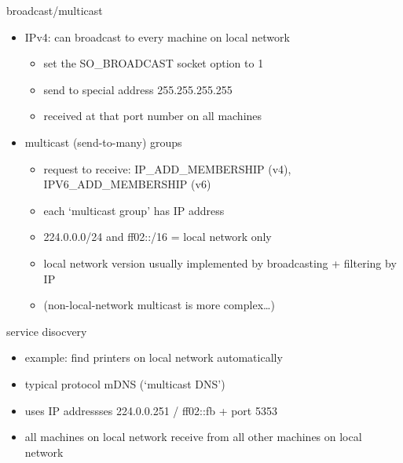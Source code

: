 \begin{frame}{broadcast/multicast}
\begin{itemize}
\item IPv4: can broadcast to every machine on local network
    \begin{itemize}
    \item set the SO\_BROADCAST socket option to 1
    \item send to special address 255.255.255.255 
    \item received at that port number on all machines
    \end{itemize}
\item multicast (send-to-many) groups
    \begin{itemize}
    \item request to receive: IP\_ADD\_MEMBERSHIP (v4), IPV6\_ADD\_MEMBERSHIP (v6)
    \item each `multicast group' has IP address
    \item 224.0.0.0/24 and ff02::/16 = local network only
    \item local network version usually implemented by broadcasting + filtering by IP
    \item (non-local-network multicast is more complex\ldots)
    \end{itemize}
\end{itemize}
\end{frame}

\begin{frame}{service disocvery}
\begin{itemize}
\item example: find printers on local network automatically
\vspace{.5cm}
\item typical protocol mDNS (`multicast DNS')
\item uses IP addressses 224.0.0.251 / ff02::fb + port 5353
\item all machines on local network receive from all other machines on local network
\end{itemize}
\end{frame}
